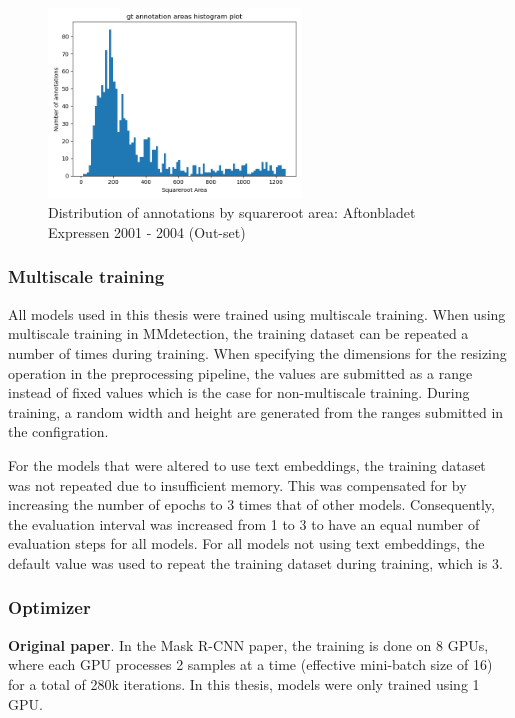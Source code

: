 \documentclass[oneside, english, bibtex]{kththesis}
\begin{document}
\begin{figure}[H]
  \begin{center}
    \includegraphics[width=0.6\textwidth]{figures/annotation-histogram-outset.png}
  \end{center}
  \caption{Distribution of annotations by squareroot area: Aftonbladet Expressen 2001 - 2004 (Out-set)}
  \label{fig:size_dist_annotations_out}
\end{figure}

\subsubsection{Multiscale training}

All models used in this thesis were trained using multiscale training. When using multiscale training in MMdetection, the training dataset can be repeated a number of times during training. When specifying the dimensions for the resizing operation in the preprocessing pipeline, the values are submitted as a range instead of fixed values which is the case for non-multiscale training. During training, a random width and height are generated from the ranges submitted in the configration. 

For the models that were altered to use text embeddings, the training dataset was not repeated due to insufficient memory. This was compensated for by increasing the number of epochs to 3 times that of other models. Consequently, the evaluation interval was increased from 1 to 3 to have an equal number of evaluation steps for all models. For all models not using text embeddings, the default value was used to repeat the training dataset during training, which is 3.

\subsubsection{Optimizer}

\textbf{Original paper}. In the Mask R-CNN paper, the training is done on 8 GPUs, where each GPU processes 2 samples at a time (effective mini-batch size of 16) for a total of 280k iterations.
In this thesis, models were only trained using 1 GPU.
\end{document}
